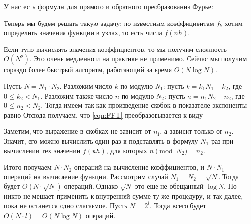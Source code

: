 \documentclass[a4paper]{article}
\begin{document}
У нас есть формулы для прямого и обратного преобразования Фурье:


Теперь мы будем решать такую задачу: по известным коэффициентам $f_k$
хотим определить значения функции в узлах, то есть числа $f(nh)$.


Если тупо вычислять значения коэффициентов, то мы получим сложность
$O(N^2)$. Это очень медленно и на практике не применимо. Сейчас мы
получим гораздо более быстрый алгоритм, работающий за время $O(N\log
N)$.

Пусть $N=N_1\cdot N_2$. Разложим число $k$ по модулю $N_1$: пусть $k =
k_1N_1 + k_2$, где $0\le k_2 < N_1$.  Разложим также число $n$ по
модулю $N_2$: пусть $n = n_1 N_2 + n_2$, где $0\le n_2 < N_2$.  Тогда
имеем  так как произведение скобок в
показателе экспоненты равно   Отсюда получаем, что \eqref{eqn:FFT}
преобразовывается к виду

Заметим, что выражение в скобках не зависит от $n_1$, а зависит только
от $n_2$. Значит, его можно вычислить один раз и подставлять в формулу
$N_1$ раз при вычислении тех значений $f(nh)$, для которых $n
\pmod{N_2} = n_2$.

Итого получаем $N \cdot N_2$ операций на вычисление коэффициентов, и
$N\cdot N_1$ операций на вычисление функции.  Рассмотрим случай $N_1 =
N_2 = \sqrt N$. Тогда будет $O(N\cdot \sqrt N)$ операций.  Однако
$\sqrt N$ это еще не обещанный $\log N$. Но никто не мешает применить
к внутренней сумме ту же процедуру, и так далее, пока не останется
одно слагаемое.  Пусть $N = 2^l$. Тогда всего будет $O(N\cdot l) = O(N
\log N)$ операций.
\end{document}
